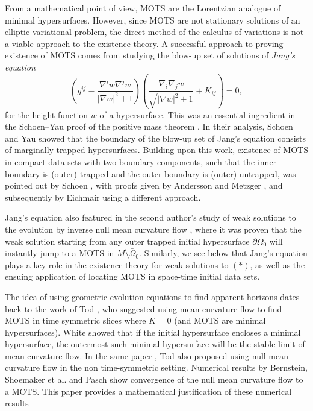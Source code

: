 \documentclass[11pt]{amsart}
\begin{document}
From a mathematical point of view, MOTS are the Lorentzian analogue of minimal hypersurfaces. However, since MOTS are not stationary solutions of an elliptic variational problem, the direct method of the calculus of variations is not a viable approach to the existence theory. A successful approach to proving existence of MOTS comes from studying the blow-up set of solutions of \textit{Jang's equation}
\begin{equation}\label{Jang}
\left(g^{ij}-\dfrac{\nabla^iw\nabla^jw}{|\nabla w|^2+1}\right)\left(\dfrac{\nabla_i\nabla_jw}{\sqrt{|\nabla w|^2+1}}+K_{ij}\right)=0,
\end{equation}
for the height function $w$ of a hypersurface. This was an essential ingredient in the Schoen--Yau proof of the positive mass theorem  \cite{SY81}. In their analysis, Schoen and Yau showed that the boundary of the blow-up set  of Jang's equation consists of marginally trapped hypersurfaces. Building upon this work, existence of MOTS in compact data sets with two boundary components, such that the inner boundary is (outer) trapped and the outer boundary is (outer) untrapped, was pointed out by Schoen \cite{S04}, with proofs given by Andersson and Metzger  \cite{AM09}, and subsequently by Eichmair \cite{E09} using a different approach. 

Jang's equation also featured in the second author's study of weak solutions to the evolution by inverse null mean curvature flow  \cite{KM13}, where it was proven that the weak solution starting from any outer trapped initial hypersurface $\partial\Omega_0$ will instantly jump to a MOTS in $M\setminus\bar{\Omega}_0$. Similarly, we see below that Jang's equation plays a key role in the existence theory for weak solutions to $(*)$, as well as the ensuing application of locating MOTS in space-time initial data sets. 

The idea of using geometric evolution equations to find apparent horizons dates back to the work of Tod \cite{Tod}, who suggested using mean curvature flow to find MOTS in time symmetric slices where $K=0$ (and MOTS are minimal hypersurfaces). White \cite{W00} showed that if the initial hypersurface encloses a minimal hypersurface, the outermost such minimal hypersurface will be the stable limit of mean curvature flow. In the same paper \cite{Tod}, Tod also proposed using null mean curvature flow  in the non time-symmetric setting. Numerical results by Bernstein, Shoemaker et al. and Pasch \cite{P97} show convergence of the null mean curvature flow to a MOTS. This paper provides a mathematical justification of these numerical results
\end{document}
